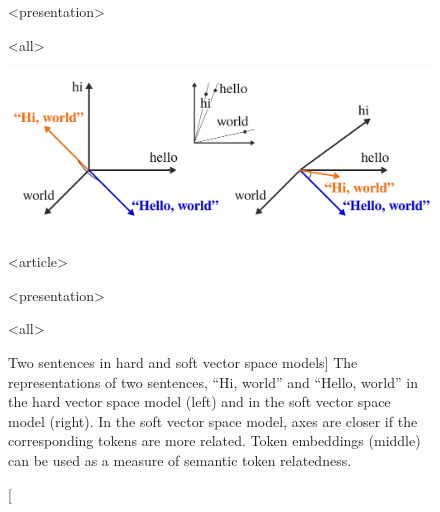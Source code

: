 \begin{figure}

\mode
<presentation>

\vspace*{-0.9cm}

\mode
<all>

\centering
\includegraphics{soft-vsm}

\mode
<article>

\vspace{-0.4cm}

\mode
<presentation>

\vspace{-0.6cm}

\mode
<all>

\caption
  [Two sentences in hard and soft vector space models]%
  {The representations of two sentences, ``Hi, world'' and ``Hello,
   world'' in the hard vector space model (left) and in the soft vector space
   model (right). In the soft vector space model, axes are closer if the
   corresponding tokens are more related. Token embeddings (middle) can be used
   as a measure of semantic token relatedness.
   \cite[Figure 6]{novotny2020three}}
\label{fig:soft-vsm}
\end{figure}
